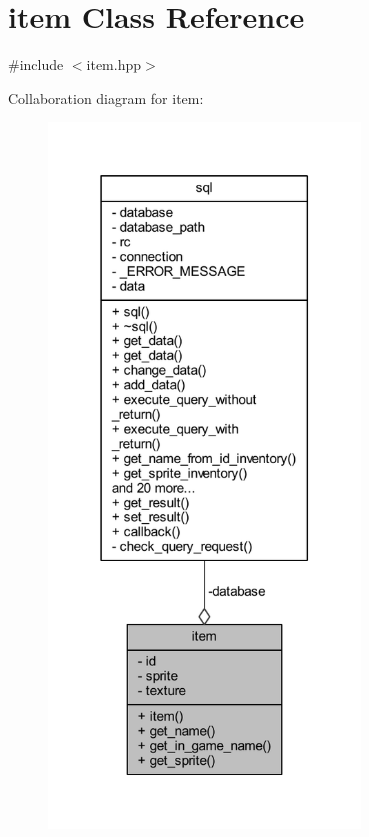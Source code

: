 \hypertarget{classitem}{}\section{item Class Reference}
\label{classitem}


{\ttfamily \#include $<$item.\+hpp$>$}



Collaboration diagram for item\+:
\nopagebreak
\begin{figure}[H]
\begin{center}
\leavevmode
\includegraphics[width=235pt]{classitem__coll__graph}
\end{center}
\end{figure}

